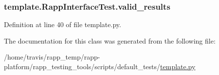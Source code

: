 \hypertarget{classtemplate_1_1RappInterfaceTest_a239eefdd36f007153ae692ade8d9dfec}{
\subsubsection[{valid\-\_\-results}]{\setlength{\rightskip}{0pt plus 5cm}template.\-Rapp\-Interface\-Test.\-valid\-\_\-results}}\label{classtemplate_1_1RappInterfaceTest_a239eefdd36f007153ae692ade8d9dfec}


Definition at line 40 of file template.\-py.



The documentation for this class was generated from the following file\-:\begin{DoxyCompactItemize}
\item 
/home/travis/rapp\-\_\-temp/rapp-\/platform/rapp\-\_\-testing\-\_\-tools/scripts/default\-\_\-tests/\hyperlink{template_8py}{template.\-py}\end{DoxyCompactItemize}
